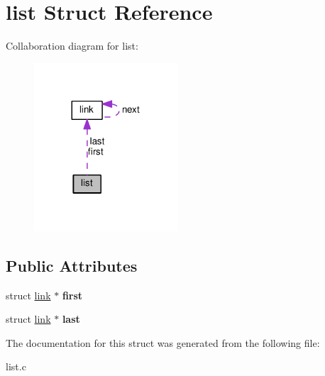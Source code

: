 \hypertarget{structlist}{}\section{list Struct Reference}
\label{structlist}


Collaboration diagram for list\+:
\nopagebreak
\begin{figure}[H]
\begin{center}
\leavevmode
\includegraphics[width=152pt]{structlist__coll__graph}
\end{center}
\end{figure}
\subsection*{Public Attributes}
\begin{DoxyCompactItemize}
\item 
struct \hyperlink{structlink}{link} $\ast$ {\bfseries first}\hypertarget{structlist_a150377eb7a795b73db20b6c9aa6142a1}{}\label{structlist_a150377eb7a795b73db20b6c9aa6142a1}

\item 
struct \hyperlink{structlink}{link} $\ast$ {\bfseries last}\hypertarget{structlist_a8a76dcf4fdaef331b9e58f1088960163}{}\label{structlist_a8a76dcf4fdaef331b9e58f1088960163}

\end{DoxyCompactItemize}


The documentation for this struct was generated from the following file\+:\begin{DoxyCompactItemize}
\item 
list.\+c\end{DoxyCompactItemize}
